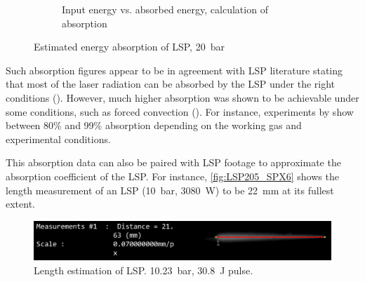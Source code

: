 \begin{figure}[h]
\begin{subfigure}[t]{0.47\textwidth}
                    \caption{Input energy vs. absorbed energy, calculation of absorption}
                    \label{fig:absorption_20bar}
                \end{subfigure}
                \caption{Estimated energy absorption of LSP, \qty{20}{bar}}
                \label{fig:LSP_absorption_data}
            \end{figure}

            Such absorption figures appear to be in agreement with LSP literature stating that most of the laser radiation can be absorbed by the LSP under the right conditions (\textcite{keeferLaserSustainedPlasmas1989}). However, much higher absorption was shown to be achievable under some conditions, such as forced convection (\textcite{fowlerIgnitionMaintenanceSubsonic1975}). For instance, experiments by \textcite{toyodaThrustPerformanceCW2002} show between 80\% and 99\% absorption depending on the working gas and experimental conditions.

            This absorption data can also be paired with LSP footage to approximate the absorption coefficient of the LSP. For instance, \autoref{fig:LSP205_SPX6} shows the length measurement of an LSP (\qty{10}{bar}, \qty{3080}{W}) to be \qty{22}{mm} at its fullest extent.

            \begin{figure}[h]
                \centering
                \includegraphics[width=\textwidth]{assets/5 results/LSP6_10.23_length.png}
                \caption[Length estimation of LSP]{Length estimation of LSP. \qty{10.23}{bar}, \qty{30.8}{J} pulse. }
                \label{fig:LSP205_SPX6}
            \end{figure}

